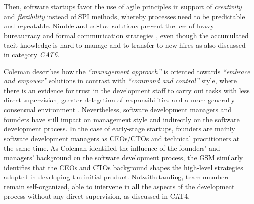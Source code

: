 \documentclass[10pt,journal,letterpaper,compsoc]{IEEEtran}
\begin{document}
Then, software startups favor the use of agile principles in support of
\textit{creativity} and \textit{flexibility} instead of SPI methods, whereby
processes need to be predictable and repeatable. Nimble and ad-hoc solutions
prevent the use of heavy bureaucracy and formal communication strategies %
, even though the accumulated tacit knowledge is hard to manage and to transfer 
to new hires as also discussed in category \textit{CAT6}.

Coleman describes how the \textit{``management approach''} is oriented towards
\textit{``embrace and empower''} solutions in contrast with \textit{``command
and control''} style, where there is an evidence for trust in the  development
staff to carry out tasks with less direct supervision, greater delegation of
responsibilities and a more generally consensual environment \cite{Coleman2008}.
Nevertheless, software development managers and founders have still impact on
management style and indirectly on the software development process. In the case
of early-stage startups, founders are mainly software development managers as
CEOs/CTOs and  technical practitioners at the same time. As Coleman identified
the influence of the founders' and managers' background on the software
development process, the GSM similarly identifies that the CEOs and CTOs
background shapes the high-level strategies adopted in developing the initial
product. Notwithstanding, team members remain self-organized, able to intervene
in all the aspects of the development process without any direct supervision, as
discussed in CAT4.
\end{document}
